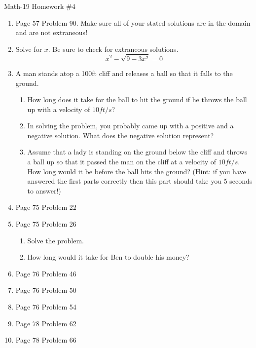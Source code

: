 \documentclass[letterpaper,12pt,fleqn]{article}
\begin{document}
\begin{center}
\Large Math-19 Homework \#4
\end{center}

\vspace{0.5in}

\begin{enumerate}
\item Page 57 Problem 90. Make sure all of your stated solutions are in the
domain and are not extraneous!

\item Solve for $x$. Be sure to check for extraneous solutions.
\[x^2-\sqrt{9-3x^2}=0\]

\item A man stands atop a 100ft cliff and releases a ball so that it falls to
the ground.
\begin{enumerate}
\item How long does it take for the ball to hit the ground if he throws the
ball up with a velocity of $10 ft/s$?

\item In solving the problem, you probably came up with a positive and a
negative solution.  What does the negative solution represent?

\item Assume that a lady is standing on the ground below the cliff and throws
a ball up so that it passed the man on the cliff at a velocity of $10 ft/s$.
How long would it be before the ball hits the ground? (Hint: if you have
answered the first parts correctly then this part should take you 5 seconds
to answer!)
\end{enumerate}

\item Page 75 Problem 22

\item Page 75 Problem 26
\begin{enumerate}
\item Solve the problem.
\item How long would it take for Ben to double his money?
\end{enumerate}

\item Page 76 Problem 46

\item Page 76 Problem 50

\item Page 76 Problem 54

\item Page 78 Problem 62

\item Page 78 Problem 66

\end{enumerate}
\end{document}
